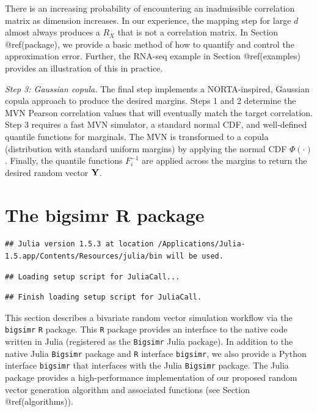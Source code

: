 \documentclass{article}
\begin{document}
There is an increasing probability of encountering an inadmissible
correlation matrix as dimension increases. In our experience, the
mapping step for large \(d\) almost always produces a \(R_X\) that is
not a correlation matrix. In Section @ref(package), we provide a basic
method of how to quantify and control the approximation error. Further,
the RNA-seq example in Section @ref(examples) provides an illustration
of this in practice.

\emph{Step 3: Gaussian copula.} The final step implements a
NORTA-inspired, Gaussian copula approach to produce the desired margins.
Steps 1 and 2 determine the MVN Pearson correlation values that will
eventually match the target correlation. Step 3 requires a fast MVN
simulator, a standard normal CDF, and well-defined quantile functions
for marginals. The MVN is transformed to a copula (distribution with
standard uniform margins) by applying the normal CDF \(\Phi(\cdot)\).
Finally, the quantile functions \(F_i^{-1}\) are applied across the
margins to return the desired random vector \({\bf Y}\).

\hypertarget{the-bigsimr-r-package}{%
\section{The bigsimr R package}\label{the-bigsimr-r-package}}

\begin{verbatim}
## Julia version 1.5.3 at location /Applications/Julia-1.5.app/Contents/Resources/julia/bin will be used.
\end{verbatim}

\begin{verbatim}
## Loading setup script for JuliaCall...
\end{verbatim}

\begin{verbatim}
## Finish loading setup script for JuliaCall.
\end{verbatim}

This section describes a bivariate random vector simulation workflow via
the \texttt{bigsimr} \texttt{R} package. This \texttt{R} package
provides an interface to the native code written in Julia (registered as
the \texttt{Bigsimr} Julia package). In addition to the native Julia
\texttt{Bigsimr} package and \texttt{R} interface \texttt{bigsimr}, we
also provide a Python interface \texttt{bigsimr} that interfaces with
the Julia \texttt{Bigsimr} package. The Julia package provides a
high-performance implementation of our proposed random vector generation
algorithm and associated functions (see Section @ref(algorithms)).
\end{document}
